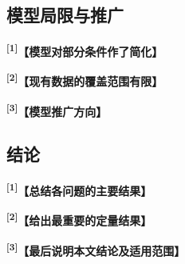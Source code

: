 \documentclass[UTF8,a4paper,12pt,fontset=fandol]{ctexart}
\newif\ifDraftAid
\newcommand{\ph}[1]{\textbf{\color{phg}【#1】}}
\newcommand{\detail}[1]{%
  \ifDraftAid\textnormal{\color{detailg}\small\,（参考写法：#1）}\fi}
\newcommand{\PHD}[2]{\ph{#1}\detail{#2}}
\newcommand{\SN}[1]{\textsuperscript{\color{noteg}\bfseries[#1]}}
\newcommand{\Note}[2]{\par\noindent\textbf{[#1]}\ #2}
\newcommand{\Annotated}[2]{%
\ifDraftAid
\noindent\begin{minipage}[t]{0.735\linewidth}\vspace{0pt}#1\end{minipage}\hfill
\begin{minipage}[t]{0.235\linewidth}\vspace{0pt}\footnotesize\color{noteg}\raggedright
\begin{tcolorbox}[colback=notebg,colframe=ruleg,boxrule=0.35pt,arc=1mm,left=1.2mm,right=1.2mm,top=1mm,bottom=1mm]
#2
\end{tcolorbox}\end{minipage}
\else
#1
\fi
}
\numberwithin{figure}{section}
\numberwithin{table}{section}
\begin{document}
\subsection{模型局限与推广}
\Annotated{
\SN{1}\PHD{模型对部分条件作了简化}{模型建立过程中对〔条件或过程〕作了适当简化。当〔特殊情况〕出现时，该假设可能不再完全成立，从而使〔某项结果〕产生一定偏差。未来应尝试〔多种方法或更精细的建模方式〕，以进一步提升模型的鲁棒性和适应性。}

\par\medskip
\SN{2}\PHD{现有数据的覆盖范围有限}{题目数据主要覆盖〔时间、空间、工况或类别范围〕，因此本文结论主要适用于这些条件。对于〔未覆盖的极端情况或其他场景〕，仍需补充相应数据后再进行验证。}

\par\medskip
\SN{3}\PHD{模型推广方向}{若其他问题具有相近的〔数据形式、约束条件或研究目标〕，可在重新估计参数并完成相应检验后采用本文方法。对于数据结构或作用机理差异较大的场景，则需要重新调整模型。随着〔数据量增加和计算能力提升〕，未来的模型有望更加高效、精准地识别复杂的〔模式〕，并拓展到更多领域。}
}{
\Note{1}{模型不足写具体条件和可能造成的影响。}
\Note{2}{推广部分说明适用的相似问题以及需要重新调整的情况。}
\Note{3}{推广应建立在数据形式和建模条件相近的基础上。}
}

\subsection{结论}
\Annotated{
\SN{1}\PHD{总结各问题的主要结果}{本文围绕〔总目标〕依次完成四个问题。问题一得到〔结果1〕；问题二建立〔模型〕并得到〔主要结果〕；问题三在此基础上完成〔进一步任务〕；问题四结合前述结果得到〔最终分析结论〕。各问题之间相互衔接，构成完整的解题方案。}

\par\medskip
\SN{2}\PHD{给出最重要的定量结果}{其中，〔主要指标A〕达到〔数值A〕，相较〔比较对象〕提高/降低〔幅度〕；〔另一重要指标〕为〔数值B〕。通过〔主要检验方法〕可知，模型结果在题目给定条件下较为稳定，说明本文方法对〔核心任务〕具有较好的适用性。}

\par\medskip
\SN{3}\PHD{最后说明本文结论及适用范围}{综上，本文最终得到〔题目要求的分类、预测、评价、路径或方案〕，可以用于〔对应实际任务〕。由于现有数据主要覆盖〔范围〕，对于超出该范围的情况仍需进一步补充数据和验证。}
}{
\Note{1}{结论按问题顺序概括主要结果即可。}
\Note{2}{结论中保留最能说明结果的少量关键数值。}
\Note{3}{结尾直接说明最终得到的题目所需结果。}
}

\newpage
\end{document}
